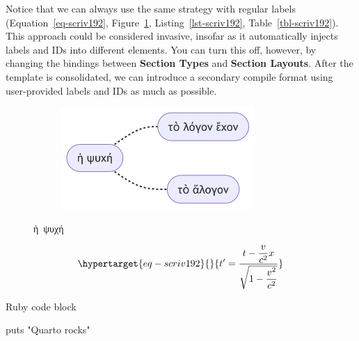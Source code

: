 \documentclass[
  12pt,
  a4paper,
  oneside,
  titlepage,
  toclink=all,
  toc=bibliography]{scrbook}
\newenvironment{Shaded}{\begin{snugshade}}{\end{snugshade}}
\newcommand{\FunctionTok}[1]{\textcolor[rgb]{0.28,0.35,0.67}{#1}}
\newcommand{\StringTok}[1]{\textcolor[rgb]{0.13,0.47,0.30}{#1}}
\theoremstyle{definition}
\theoremstyle{definition}
\theoremstyle{plain}
\theoremstyle{definition}
\theoremstyle{plain}
\theoremstyle{plain}
\theoremstyle{plain}
\theoremstyle{plain}
\theoremstyle{remark}
\begin{document}
\protect\hypertarget{scriv192}{}{}

Notice that we can always use the same strategy with regular labels
(\protect\hypertarget{cite_55}{}{\label{cite_55}Equation~\ref{eq-scriv192}},
\protect\hypertarget{cite_56}{}{\label{cite_56}Figure~\ref{fig-scriv192}},
\protect\hypertarget{cite_57}{}{\label{cite_57}Listing~\ref{lst-scriv192}},
\protect\hypertarget{cite_58}{}{\label{cite_58}Table~\ref{tbl-scriv192}}).
This approach could be considered invasive, insofar as it automatically
injects labels and IDs into different elements. You can turn this off,
however, by changing the bindings between \textbf{Section Types} and
\textbf{Section Layouts}. After the template is consolidated, we can
introduce a secondary compile format using user-provided labels and IDs
as much as possible.

\begin{figure}

{\centering 

\begin{figure}[H]

{\centering \includegraphics[width=2.89in,height=1.52in]{export_files/figure-latex/mermaid-figure-2.png}

}

\end{figure}

}

\caption{\label{fig-scriv192}ἡ~ψυχή}

\end{figure}

\begin{equation}\protect\hypertarget{eq-scriv192}{}{t' = \frac{t - \dfrac{v}{c^{2}}x}{\sqrt{1 - \dfrac{v^{2}}{c^{2}}}}}\label{eq-scriv192}\end{equation}

\begin{codelisting}

\caption{Ruby code block}

\hypertarget{lst-scriv192}{%
\label{lst-scriv192}}%
\begin{Shaded}
\begin{Highlighting}[numbers=left,,]
\FunctionTok{puts} \StringTok{"Quarto rocks"}
\end{Highlighting}
\end{Shaded}

\end{codelisting}
\end{document}
